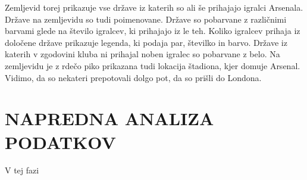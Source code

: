 \documentclass[11pt,a4paper]{article}
\begin{document}
Zemljevid torej prikazuje vse države iz katerih so ali še prihajajo igralci Arsenala. Države na zemljevidu so tudi poimenovane. Države so pobarvane z različnimi barvami glede na število igralcev, ki prihajajo iz le teh. Koliko igralcev prihaja iz določene države prikazuje legenda, ki podaja par, številko in barvo. Države iz katerih v zgodovini kluba ni prihajal noben igralec so pobarvane z belo. Na zemljevidu je z rdečo piko prikazana tudi lokacija štadiona, kjer domuje Arsenal. Vidimo, da so nekateri prepotovali dolgo pot, da so prišli do Londona.



\section{NAPREDNA ANALIZA PODATKOV}
V tej fazi 
\end{document}
